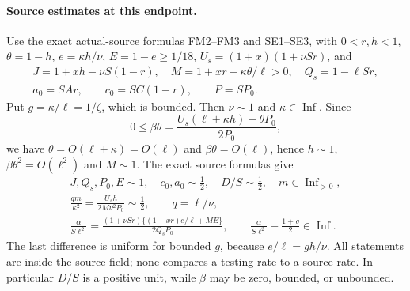 \paragraph{Source estimates at this endpoint.}
Use the exact actual-source formulas FM2--FM3 and SE1--SE3, with
$0<r,h<1$, $\theta=1-h$, $e=\kappa h/\nu$, $E=1-e\ge1/18$,
$U_s=(1+x)(1+\nu Sr)$, and
\[
\begin{gathered}
 J=1+xh-\nu S(1-r),\quad
 M=1+xr-\kappa\theta/\ell>0,\quad Q_s=1-\ell Sr,\\
 a_0=SAr,\qquad c_0=SC(1-r),\qquad P=SP_0.
\end{gathered}
\]
Put $g=\kappa/\ell=1/\zeta$, which is bounded.
Then $\nu\sim1$ and $\kappa\in\operatorname{Inf}$.
Since
\[
 0\le\beta\theta
  =\frac{U_s(\ell+\kappa h)-\theta P_0}{2P_0},
\]
we have $\theta=O(\ell+\kappa)=O(\ell)$ and
$\beta\theta=O(\ell)$, hence $h\sim1$,
$\beta\theta^2=O(\ell^2)$ and $M\sim1$.
The exact source formulas give
\[
\begin{gathered}
 J,Q_s,P_0,E\sim1,\quad c_0,a_0\sim\tfrac12,
 \quad D/S\sim\tfrac12,\quad m\in\operatorname{Inf}_{>0},\\
 \frac{qm}{\kappa^2}
   =\frac{U_s h}{2M\nu^2P_0}\sim\tfrac12,
 \qquad q=\ell/\nu,\\
 \frac{\alpha}{S\ell^2}
   =\frac{(1+\nu Sr)\{(1+xr)e/\ell+ME\}}{2Q_sP_0},
 \qquad
 \frac{\alpha}{S\ell^2}-\frac{1+g}{2}\in\operatorname{Inf}.
\end{gathered}                                                   \tag{EL0a}
\]
The last difference is uniform for bounded $g$, because
$e/\ell=gh/\nu$.  All statements are inside the source field;
none compares a testing rate to a source rate.  In particular
$D/S$ is a positive unit, while $\beta$ may be zero, bounded,
or unbounded.

